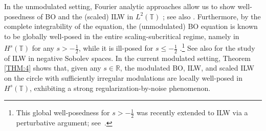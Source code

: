 \documentclass[letterpaper, 11pt,  reqno]{amsart}
\newcommand{\1}{\hspace{0.5mm}\text{I}\hspace{0.5mm}}
\newcommand{\R}{\mathbb{R}}
\newcommand{\T}{\mathbb{T}}
\numberwithin{equation}{section}
\numberwithin{theorem}{section}
\begin{document}
In the unmodulated setting, 
Fourier analytic approaches
allow us to show well-posedness of 
BO and the (scaled) ILW  in $L^2(\T)$
\cite{Moli1, Moli2, MP, CLOP};
see also \cite{Deng15}.
Furthermore, 
by the complete integrability of the equation, 
the (unmodulated) BO equation 
is known to be globally well-posed
in the entire scaling-subcritical regime, 
namely in $H^s(\T)$ for any $s > - \frac 12$, 
while it is ill-posed for $s \le -\frac 12$
\cite{GKT23, KLV}.\footnote{This global well-posedness
for $s > - \frac 12$ was recently extended to ILW via a perturbative
argument; see~\cite{GL}.}
See also \cite{CFLOP}
for the study of ILW in negative Sobolev spaces.
In the current modulated setting, 
Theorem \ref{THM:4}
shows that, 
 given  any $s \in \R$, 
the modulated BO, ILW, and scaled ILW
on  the circle
with sufficiently irregular modulations
are locally well-posed in $H^s(\T)$, 
exhibiting a strong regularization-by-noise phenomenon.
\end{document}
